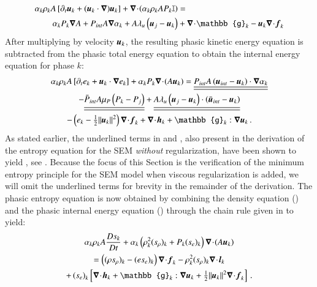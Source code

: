 \documentclass[preprint,10pt]{elsarticle}
\begin{document}
%
\begin{align}\label{eq:vel-7-eqn-model-sect4}
\alpha_k \rho_k  A \left[ \partial_t \mbold u_k + (\mbold u_k \cdot \grad) \mbold u_k \right]  + \div \left( \alpha_k \rho_k A P_k \mathbb{I} \right) &=\nonumber\\
\alpha_k P_k \grad A + P_{int} A \grad \alpha_k + A \lambda_u \left( \mbold u_j - \mbold u_k \right) &+ \div \mathbb{g}_k - \mbold u_k \div \mbold f_k
\end{align}
%
After multiplying  by velocity $\boldsymbol u_k$, the resulting phasic kinetic energy equation is subtracted 
from the phasic total energy equation to obtain the internal energy equation for phase $k$:
%
\begin{multline}\label{eq:int-ener-7-eqn-model-sect4}
\alpha_k \rho_k  A \left[ \partial_t  e_k + \mbold u_k \cdot \grad  e_k \right]  
+ \alpha_k P_k \div (A \mbold u_k ) =
  \underline{\underline{P_{int} A \left(\mbold u_{int}-\mbold u_k \right) \cdot \grad \alpha_k}}  \\
- \underline{\underline{\bar{P}_{int} A \mu_P \left(P_k-P_j \right)}} 
+ \underline{\underline{A \lambda_u \left(\mbold u_j-\mbold u_k  \right) \cdot \left(\bar{\mbold u}_{int}- \mbold u_k \right)}}\\
-\left( e_k -  \tfrac{1}{2} \| \mbold u_k \|^2 \right) \div \mbold f_k 
+ \div \mbold h_k + \mathbb{g}_k : \grad \mbold u_k \,.
\end{multline}
%
As stated earlier, the underlined terms in  and , also present in the derivation of 
the entropy equation for the SEM \emph{without} regularization, have been shown to yield , see . 
Because the focus of this Section is the verification of the minimum entropy principle for the SEM model when viscous regularization is added, 
we will omit the underlined terms for brevity in the remainder of the derivation. 
%
The phasic entropy equation is now obtained by combining the density equation () and the phasic 
internal energy equation () through the chain rule given in  to yield:
%
\begin{multline}\label{eq:ent-res-7-eqn-diss-terms}
\alpha_k \rho_k A \frac{Ds_k}{Dt} 
+ \alpha_k \left(  \rho^2_k  (s_\rho)_k + P_k (s_e)_k  \right) \div (A \mbold u_k )  \\
=  \left( (\rho s_\rho)_k - (e s_e)_k \right) \div \mbold f_k 
- \rho^2_k (s_\rho)_k \div \mbold l_k  \\
+ \left(s_e\right)_k \left[ \div \mbold h_k + \mathbb{g}_k : \grad \mbold u_k +  \tfrac{1}{2} \| \mbold u_k \|^2 \div \mbold f_k \right]
\,.
\end{multline}
\end{document}
